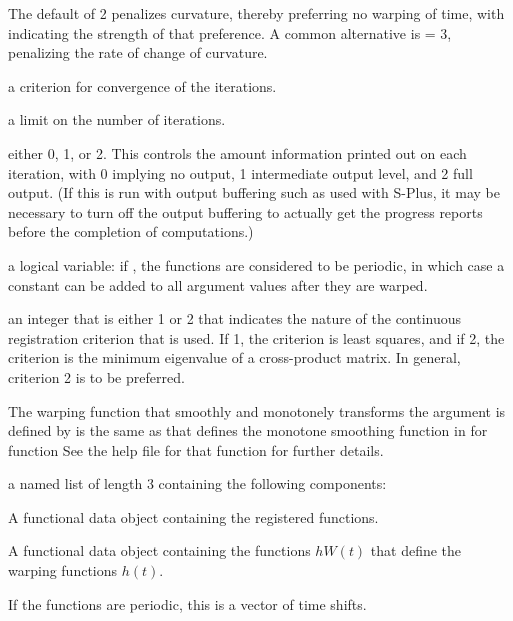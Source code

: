 \documentclass{article}
\begin{document}
\begin{Arguments}
\begin{ldescription}
The default  of 2 penalizes curvature, thereby
preferring no warping of time, with  indicating the
strength of that preference.  A common alternative is 
= 3, penalizing the rate of change of curvature.   

\item[\code{conv}] a criterion for convergence of the iterations.

\item[\code{iterlim}] a limit on the number of iterations.

\item[\code{dbglev}] either 0, 1, or 2.  This controls the amount information printed out
on each iteration, with 0 implying no output, 1 intermediate output
level, and 2 full output.  (If this is run with output buffering
such as used with S-Plus, it may be necessary to turn off the output
buffering to actually get the progress reports before the completion
of computations.)  

\item[\code{periodic}] a logical variable:  if , the functions are considered to
be periodic, in which case a constant can be added to all argument
values after they are warped. 

\item[\code{crit}] an integer that is either 1 or 2 that indicates the nature of the
continuous registration criterion that is used.  If 1, the criterion is
least squares, and if 2, the criterion is the minimum eigenvalue of a
cross-product matrix.  In general, criterion 2 is to be preferred.

\end{ldescription}
\end{Arguments}
\begin{Details}\relax
The warping function that smoothly and monotonely transforms the
argument is defined by  is the same as that defines the
monotone smoothing function in for function 
See the help file for that function for further details.
\end{Details}
\begin{Value}
a named list of length 3 containing the following components:

\begin{ldescription}
\item[\code{regfd}] A functional data object containing the registered functions.

\item[\code{Wfd}] A functional data object containing the functions $h W(t)$
that define the warping functions $h(t)$.

\item[\code{shift}] If the functions are periodic, this is a vector of time shifts.

\end{ldescription}
\end{Value}
\end{document}
